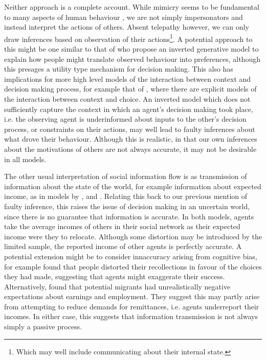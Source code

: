 \documentclass{article}
\begin{document}
Neither approach is a complete account. While mimicry seems to be fundamental to many aspects of human behaviour \citep{Chartrand1999}, we are not simply impersonators and instead interpret the actions of others. Absent telepathy however, we can only draw inferences based on observation of their actions\footnote{Which may well include communicating about their internal state.}. A potential approach to this might be one similar to that of \citet{Jern2011a} who propose an inverted generative model to explain how people might translate observed behaviour into preferences, although this presages a utility type mechanism for decision making. This also has implications for more high level models of the interaction between context and decision making process, for example that of \citet{Ben-Akiva2012}, where there are explicit models of the interaction between context and choice. An inverted model which does not sufficiently capture the context in which an agent's decision making took place, i.e. the observing agent is underinformed about inputs to the other's decision process, or constraints on their actions, may well lead to faulty inferences about what drove their behaviour. Although this is realistic, in that our own inferences about the motivations of others are not always accurate, it may not be desirable in all models.

The other usual interpretation of social information flow is as transmission of information about the state of the world, for example information about expected income, as in models by \citet{Filho2011}, and \citet{Klabunde2014}.  Relating this back to our previous mention of faulty inference, this raises the issue of decision making in an uncertain world, since there is no guarantee that information is accurate. In both models, agents take the average incomes of others in their social network as their expected income were they to relocate. Although some distortion may be introduced by the limited sample, the reported income of other agents is perfectly accurate. 
A potential extension might be to consider innaccuracy arising from cognitive bias, for example \citet{Mather2000} found that people distorted their recollections in favour of the choices they had made, suggesting that agents might exaggerate their success. Alternatively, \citet{McKenzie2013} found that potential migrants had unrealistically negative expectations about earnings and employment. They suggest this may partly arise from attempting to reduce demands for remittances, i.e. agents underreport their incomes. In either case, this suggests that information transmission is not always simply a passive process.
\end{document}
